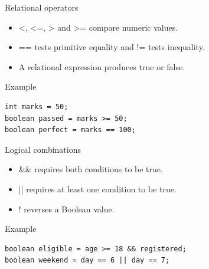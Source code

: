 \documentclass[10pt,aspectratio=169]{beamer}
\begin{document}
\begin{frame}[fragile,t]{Relational operators}
\begin{itemize}
\item \textless{}, \textless{}=, \textgreater{} and \textgreater{}= compare numeric values.
\item == tests primitive equality and != tests inequality.
\item A relational expression produces true or false.
\end{itemize}
\vspace{1mm}\begin{block}{Example}
\begin{lstlisting}
int marks = 50;
boolean passed = marks >= 50;
boolean perfect = marks == 100;
\end{lstlisting}
\end{block}
\end{frame}

\begin{frame}[fragile,t]{Logical combinations}
\begin{itemize}
\item \&\& requires both conditions to be true.
\item || requires at least one condition to be true.
\item ! reverses a Boolean value.
\end{itemize}
\vspace{1mm}\begin{block}{Example}
\begin{lstlisting}
boolean eligible = age >= 18 && registered;
boolean weekend = day == 6 || day == 7;
\end{lstlisting}
\end{block}
\end{frame}
\end{document}
